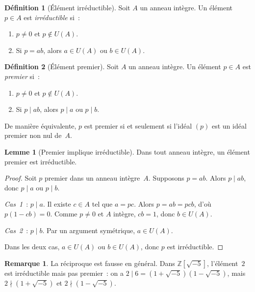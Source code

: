 \documentclass[12pt,a4paper,openany]{book}
\theoremstyle{definition}
\newtheorem{definition}{Définition}[chapter]
\newtheorem{lemme}{Lemme}[chapter]
\newtheorem{remarque}{Remarque}[chapter]
\newcommand{\Z}{\mathbb{Z}}
\begin{document}
\begin{definition}[Élément irréductible]\label{def:irreductible}
Soit $A$ un anneau intègre. Un élément $p \in A$ est \emph{irréductible}
si~:
\begin{enumerate}[label=\textup{(\roman*)}]
  \item $p \neq 0$ et $p \notin U(A)$.
  \item Si $p = ab$, alors $a \in U(A)$ ou $b \in U(A)$.
\end{enumerate}
\end{definition}

\begin{definition}[Élément premier]\label{def:premier}
Soit $A$ un anneau intègre. Un élément $p \in A$ est \emph{premier}
si~:
\begin{enumerate}[label=\textup{(\roman*)}]
  \item $p \neq 0$ et $p \notin U(A)$.
  \item Si $p \mid ab$, alors $p \mid a$ ou $p \mid b$.
\end{enumerate}
De manière équivalente, $p$ est premier si et seulement si l'idéal
$(p)$ est un idéal premier non nul de~$A$.
\end{definition}

\begin{lemme}[Premier implique irréductible]\label{lem:premier-irred}
Dans tout anneau intègre, un élément premier est irréductible.
\end{lemme}

\begin{proof}
Soit $p$ premier dans un anneau intègre~$A$. Supposons $p = ab$. Alors
$p \mid ab$, donc $p \mid a$ ou $p \mid b$.

\emph{Cas~1}~: $p \mid a$. Il existe $c \in A$ tel que $a = pc$. Alors
$p = ab = pcb$, d'où $p(1 - cb) = 0$. Comme $p \neq 0$ et $A$ intègre,
$cb = 1$, donc $b \in U(A)$.

\emph{Cas~2}~: $p \mid b$. Par un argument symétrique, $a \in U(A)$.

Dans les deux cas, $a \in U(A)$ ou $b \in U(A)$, donc $p$ est
irréductible.
\end{proof}

\begin{remarque}\label{rem:irred-pas-premier}
La réciproque est fausse en général. Dans
$\Z[\sqrt{-5}]$\index{$\Z[\sqrt{-5}]$}, l'élément~$2$ est irréductible
mais pas premier~: on a $2 \mid 6 = (1 + \sqrt{-5})(1 - \sqrt{-5})$,
mais $2 \nmid (1 + \sqrt{-5})$ et $2 \nmid (1 - \sqrt{-5})$.
\end{remarque}
\end{document}
